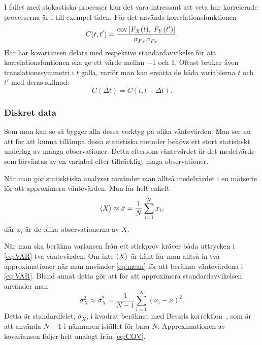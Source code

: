I fallet med stokastiska processer kan det vara intressant att veta
hur korrelerade processerna är i till exempel tiden. För det används
korrelationsfunktionen 
\begin{equation}\label{eq:CORR}
C(t, t') = \frac{\text{cov}\left[F_X(t),\;F_Y(t')\right]}{\sigma_{F_X}\sigma_{F_Y}}.
\end{equation}
Här har kovariansen delats med respektive standardavvikelse för att
korrelationsfuntionen ska ge ett värde mellan 
$-1$ och $1$. 
Oftast brukar även translationssymmetri i $t$ gälla, varför man kan
ersätta de båda variablerna $t$ och $t'$ med deras skilnad:
\begin{equation}
C(\Delta t) = C(t, t+\Delta t).
\end{equation}


\subsubsection{Diskret data}
Som man kan se så bygger alla dessa 
verktyg på olika väntevärden. Man ser nu att för att kunna tillämpa
dessa statistiska metoder behövs ett stort statistiskt underlag av
många observationer. Detta eftersom väntevärdet är det medelvärde
som förväntas av en variabel efter tillräckligt måga observationer.


När man gör statisktiska analyser använder man alltså medelvärdet i en
mätserie för att approximera väntevärden. Man får helt enkelt
\begin{equation}\label{eq:mean}
\ev{X} \approx \bar{x} = \frac{1}{N} \sum_{i=1}^N x_i,
\end{equation}
där $x_i$ är de olika observationerna av $X$. 

När man ska beräkna variansen från ett stickprov kräver båda uttrycken
i \eqref{eq:VAR} två väntevärden. Om inte $\ev{X}$ är känt får man
alltså in två approximationer när man använder \eqref{eq:mean} för att
beräkna väntevärdena i \eqref{eq:VAR}. Bland annat detta gör att för
att approximera standardavvikelsen använder man
\begin{equation}
\sigma_X^2 \approx \bar{\sigma}_X^2
=  \frac{1}{N-1} \sum_{i=1}^N \left(x_i-\bar{x}\right)^2.
\end{equation}
Detta är standardfelet, $\bar{\sigma}_X$, i kvadrat beräknat med
Bessels korrektion~\cite{Rice_matstat2006}, som är att använda ${N-1}$
i nämnaren istället för bara $N$. Approximationen av kovariansen
följer helt analogt från \eqref{eq:COV}.


